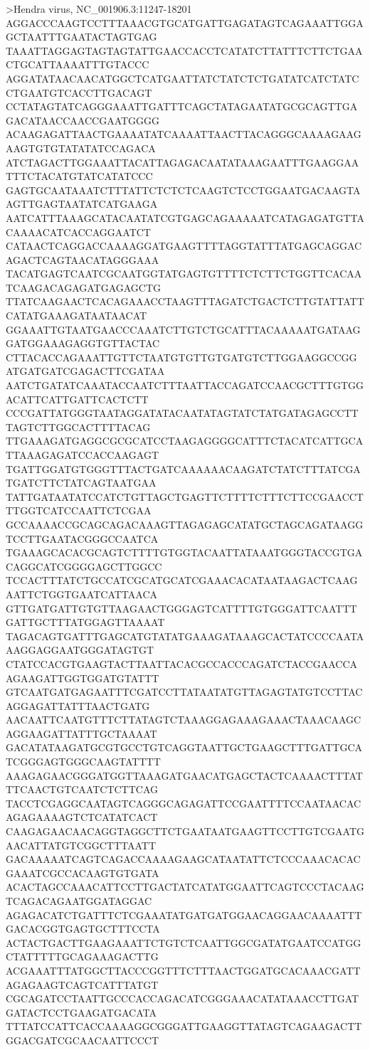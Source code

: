 >Hendra virus, NC_001906.3:11247-18201
AGGACCCAAGTCCTTTAAACGTGCATGATTGAGATAGTCAGAAATTGGAGCTAATTTGAATACTAGTGAG
TAAATTAGGAGTAGTAGTATTGAACCACCTCATATCTTATTTCTTCTGAACTGCATTAAAATTTGTACCC
AGGATATAACAACATGGCTCATGAATTATCTATCTCTGATATCATCTATCCTGAATGTCACCTTGACAGT
CCTATAGTATCAGGGAAATTGATTTCAGCTATAGAATATGCGCAGTTGAGACATAACCAACCGAATGGGG
ACAAGAGATTAACTGAAAATATCAAAATTAACTTACAGGGCAAAAGAAGAAGTGTGTATATATCCAGACA
ATCTAGACTTGGAAATTACATTAGAGACAATATAAAGAATTTGAAGGAATTTCTACATGTATCATATCCC
GAGTGCAATAAATCTTTATTCTCTCTCAAGTCTCCTGGAATGACAAGTAAGTTGAGTAATATCATGAAGA
AATCATTTAAAGCATACAATATCGTGAGCAGAAAAATCATAGAGATGTTACAAAACATCACCAGGAATCT
CATAACTCAGGACCAAAAGGATGAAGTTTTAGGTATTTATGAGCAGGACAGACTCAGTAACATAGGGAAA
TACATGAGTCAATCGCAATGGTATGAGTGTTTTCTCTTCTGGTTCACAATCAAGACAGAGATGAGAGCTG
TTATCAAGAACTCACAGAAACCTAAGTTTAGATCTGACTCTTGTATTATTCATATGAAAGATAATAACAT
GGAAATTGTAATGAACCCAAATCTTGTCTGCATTTACAAAAATGATAAGGATGGAAAGAGGTGTTACTAC
CTTACACCAGAAATTGTTCTAATGTGTTGTGATGTCTTGGAAGGCCGGATGATGATCGAGACTTCGATAA
AATCTGATATCAAATACCAATCTTTAATTACCAGATCCAACGCTTTGTGGACATTCATTGATTCACTCTT
CCCGATTATGGGTAATAGGATATACAATATAGTATCTATGATAGAGCCTTTAGTCTTGGCACTTTTACAG
TTGAAAGATGAGGCGCGCATCCTAAGAGGGGCATTTCTACATCATTGCATTAAAGAGATCCACCAAGAGT
TGATTGGATGTGGGTTTACTGATCAAAAAACAAGATCTATCTTTATCGATGATCTTCTATCAGTAATGAA
TATTGATAATATCCATCTGTTAGCTGAGTTCTTTTCTTTCTTCCGAACCTTTGGTCATCCAATTCTCGAA
GCCAAAACCGCAGCAGACAAAGTTAGAGAGCATATGCTAGCAGATAAGGTCCTTGAATACGGGCCAATCA
TGAAAGCACACGCAGTCTTTTGTGGTACAATTATAAATGGGTACCGTGACAGGCATCGGGGAGCTTGGCC
TCCACTTTATCTGCCATCGCATGCATCGAAACACATAATAAGACTCAAGAATTCTGGTGAATCATTAACA
GTTGATGATTGTGTTAAGAACTGGGAGTCATTTTGTGGGATTCAATTTGATTGCTTTATGGAGTTAAAAT
TAGACAGTGATTTGAGCATGTATATGAAAGATAAAGCACTATCCCCAATAAAGGAGGAATGGGATAGTGT
CTATCCACGTGAAGTACTTAATTACACGCCACCCAGATCTACCGAACCAAGAAGATTGGTGGATGTATTT
GTCAATGATGAGAATTTCGATCCTTATAATATGTTAGAGTATGTCCTTACAGGAGATTATTTAACTGATG
AACAATTCAATGTTTCTTATAGTCTAAAGGAGAAAGAAACTAAACAAGCAGGAAGATTATTTGCTAAAAT
GACATATAAGATGCGTGCCTGTCAGGTAATTGCTGAAGCTTTGATTGCATCGGGAGTGGGCAAGTATTTT
AAAGAGAACGGGATGGTTAAAGATGAACATGAGCTACTCAAAACTTTATTTCAACTGTCAATCTCTTCAG
TACCTCGAGGCAATAGTCAGGGCAGAGATTCCGAATTTTCCAATAACACAGAGAAAAGTCTCATATCACT
CAAGAGAACAACAGGTAGGCTTCTGAATAATGAAGTTCCTTGTCGAATGAACATTATGTCGGCTTTAATT
GACAAAAATCAGTCAGACCAAAAGAAGCATAATATTCTCCCAAACACACGAAATCGCCACAAGTGTGATA
ACACTAGCCAAACATTCCTTGACTATCATATGGAATTCAGTCCCTACAAGTCAGACAGAATGGATAGGAC
AGAGACATCTGATTTCTCGAAATATGATGATGGAACAGGAACAAAATTTGACACGGTGAGTGCTTTCCTA
ACTACTGACTTGAAGAAATTCTGTCTCAATTGGCGATATGAATCCATGGCTATTTTTGCAGAAAGACTTG
ACGAAATTTATGGCTTACCCGGTTTCTTTAACTGGATGCACAAACGATTAGAGAAGTCAGTCATTTATGT
CGCAGATCCTAATTGCCCACCAGACATCGGGAAACATATAAACCTTGATGATACTCCTGAAGATGACATA
TTTATCCATTCACCAAAAGGCGGGATTGAAGGTTATAGTCAGAAGACTTGGACGATCGCAACAATTCCCT
